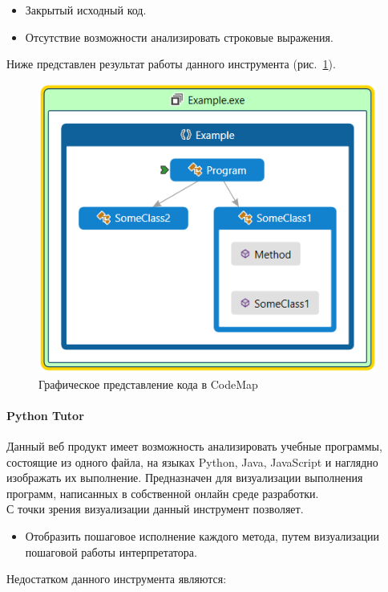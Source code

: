 \documentclass{matmex-diploma}
\begin{document}
\begin{itemize}

        \item { Закрытый исходный код. }
        \item { Отсутствие возможности анализировать строковые выражения. }
        
 \end{itemize}

Ниже представлен результат работы данного инструмента (рис.~\ref{CodeMap}).
\begin{figure}[h]
\label{CodeMap}
\centering
\includegraphics{CodeMap.PNG}
\caption{Графическое представление кода в CodeMap}
\end{figure}


\paragraph {Python Tutor}
Данный веб продукт имеет возможность анализировать учебные программы, состоящие из одного файла, на языках Python, Java, JavaScript и наглядно изображать их выполнение. Предназначен для визуализации выполнения программ, написанных в собственной онлайн среде разработки.  \\
С точки зрения визуализации данный инструмент позволяет.

\begin{itemize}

        \item { Отобразить пошаговое исполнение каждого метода, путем визуализации пошаговой работы интерпретатора. }
        
 \end{itemize}
Недостатком данного инструмента являются:
\end{document}
